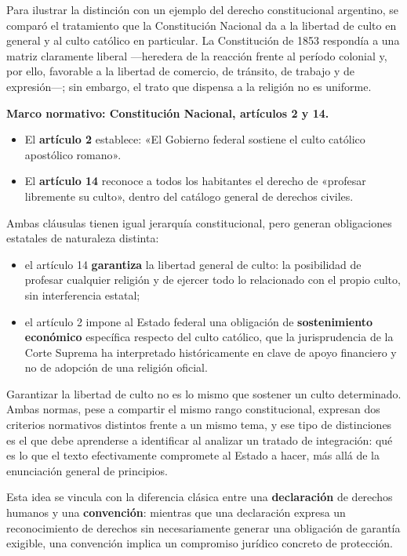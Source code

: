 \documentclass[12pt,oneside]{book}
\begin{document}
Para ilustrar la distinción con un ejemplo del derecho constitucional argentino, se comparó el tratamiento que la Constitución Nacional da a la libertad de culto en general y al culto católico en particular. La Constitución de 1853 respondía a una matriz claramente liberal —heredera de la reacción frente al período colonial y, por ello, favorable a la libertad de comercio, de tránsito, de trabajo y de expresión—; sin embargo, el trato que dispensa a la religión no es uniforme.

\textbf{Marco normativo: Constitución Nacional, artículos 2 y 14.}
\begin{itemize}
    \item El \textbf{artículo 2} establece: «El Gobierno federal sostiene el culto católico apostólico romano».
    \item El \textbf{artículo 14} reconoce a todos los habitantes el derecho de «profesar libremente su culto», dentro del catálogo general de derechos civiles.
\end{itemize}

Ambas cláusulas tienen igual jerarquía constitucional, pero generan obligaciones estatales de naturaleza distinta:
\begin{itemize}
    \item el artículo 14 \textbf{garantiza} la libertad general de culto: la posibilidad de profesar cualquier religión y de ejercer todo lo relacionado con el propio culto, sin interferencia estatal;
    \item el artículo 2 impone al Estado federal una obligación de \textbf{sostenimiento económico} específica respecto del culto católico, que la jurisprudencia de la Corte Suprema ha interpretado históricamente en clave de apoyo financiero y no de adopción de una religión oficial.
\end{itemize}

Garantizar la libertad de culto no es lo mismo que sostener un culto determinado. Ambas normas, pese a compartir el mismo rango constitucional, expresan dos criterios normativos distintos frente a un mismo tema, y ese tipo de distinciones es el que debe aprenderse a identificar al analizar un tratado de integración: qué es lo que el texto efectivamente compromete al Estado a hacer, más allá de la enunciación general de principios.

Esta idea se vincula con la diferencia clásica entre una \textbf{declaración} de derechos humanos y una \textbf{convención}: mientras que una declaración expresa un reconocimiento de derechos sin necesariamente generar una obligación de garantía exigible, una convención implica un compromiso jurídico concreto de protección.
\end{document}
